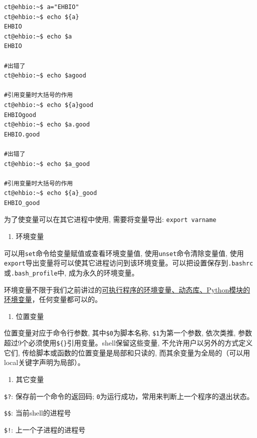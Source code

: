 \documentclass[]{article}
\providecommand{\tightlist}{%
  \setlength{\itemsep}{0pt}\setlength{\parskip}{0pt}}
\numberwithin{figure}{section}
\numberwithin{table}{section}
\begin{document}
\begin{verbatim}
ct@ehbio:~$ a="EHBIO"
ct@ehbio:~$ echo ${a}
EHBIO
ct@ehbio:~$ echo $a
EHBIO

#出错了
ct@ehbio:~$ echo $agood

#引用变量时大括号的作用
ct@ehbio:~$ echo ${a}good
EHBIOgood
ct@ehbio:~$ echo $a.good
EHBIO.good

#出错了
ct@ehbio:~$ echo $a_good

#引用变量时大括号的作用
ct@ehbio:~$ echo ${a}_good
EHBIO_good
\end{verbatim}

为了使变量可以在其它进程中使用, 需要将变量导出: \texttt{export\ varname}

\begin{enumerate}
\def\labelenumi{\arabic{enumi}.}
\setcounter{enumi}{1}
\tightlist
\item
  环境变量
\end{enumerate}

可以用\texttt{set}命令给变量赋值或查看环境变量值, 使用\texttt{unset}命令清除变量值, 使用\texttt{export}导出变量将可以使其它进程访问到该环境变量。可以把设置保存到\texttt{.bashrc}或\texttt{.bash\_profile}中, 成为永久的环境变量。

环境变量不限于我们之前讲过的\href{http://mp.weixin.qq.com/s/TNU7X2mhfVVffaJ7NRBuNA}{可执行程序的环境变量、动态库、Python模块的环境变量}，任何变量都可以的。

\begin{enumerate}
\def\labelenumi{\arabic{enumi}.}
\setcounter{enumi}{2}
\tightlist
\item
  位置变量
\end{enumerate}

位置变量对应于命令行参数, 其中\texttt{\$0}为脚本名称, \texttt{\$1}为第一个参数, 依次类推, 参数超过9个必须使用\texttt{\$\{\}}引用变量。shell保留这些变量, 不允许用户以另外的方式定义它们, 传给脚本或函数的位置变量是局部和只读的, 而其余变量为全局的（可以用local关键字声明为局部）。

\begin{enumerate}
\def\labelenumi{\arabic{enumi}.}
\setcounter{enumi}{3}
\tightlist
\item
  其它变量
\end{enumerate}

\texttt{\$?}: 保存前一个命令的返回码; \texttt{0}为运行成功，常用来判断上一个程序的退出状态。

\texttt{\$\$}: 当前shell的进程号

\texttt{\$!}: 上一个子进程的进程号
\end{document}
